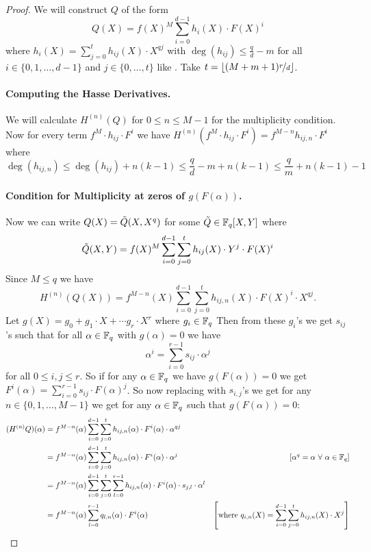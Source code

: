\begin{proof}
  We will construct $Q$ of the form $$Q(X)=f(X)^M\sum_{i=0}^{d-1}h_i(X)\cdot F(X)^i$$ where $h_i(X)=\sum_{j=0}^th_{ij}(X)\cdot X^{qj}$ with $\deg(h_{ij})\leq \frac{q}{d}-m$ for all $i\in\{0,1,\dots, d-1\}$ and $j\in\{0,\dots, t\}$ like \StepanovLinIndeplem. Take $t=\left\lfloor (M+m+1)\nicefrac{r}{d}\right\rfloor$. 
  \paragraph*{Computing the Hasse Derivatives.} %
  We will calculate $H^{(n)}(Q)$ for $0\leq n\leq M-1$ for the multiplicity condition. Now for every term $f^M\cdot h_{ij}\cdot F^i$ we have $H^{(n)}(f^M\cdot h_{ij}\cdot F^i)=f^{M-n}h_{ij,n}\cdot F^i$ where 
  \begin{equation}\label{eq:hijn}
    \deg(h_{ij,n})\leq \deg(h_{ij})+n(k-1)\leq \frac{q}d-m+n(k-1)\leq \frac{q}{m}+n(k-1)-1
  \end{equation}
  \paragraph*{Condition for Multiplicity at zeros of $g(F(\alpha))$.} Now we can write $Q(X)=\tilde{Q}(X,X^q)$ for some $\tilde{Q}\in\mathbb{F}_q[X,Y]$ where $$\tilde{Q}(X,Y)=f(X)^M\sum_{i=0}^{d-1}\sum_{j=0}^th_{ij}(X)\cdot Y^j\cdot F(X)^i$$Since $M\leq q$ we have $$H^{(n)}(Q(X))=f^{M-n}(X)\sum_{i=0}^{d-1}\sum_{j=0}^th_{ij,n}(X)\cdot F(X)^i\cdot X^{qj}.$$Let $g(X)=g_0+g_1\cdot X+\cdots g_r\cdot X^r$ where $g_i\in\mathbb{F}_q$ Then from these $g_i$'s we get $s_{ij}$'s such that for all $\alpha\in\mathbb{F}_q$ with $g(\alpha)=0$ we have $$\alpha^i=\sum_{i=0}^{r-1}s_{ij}\cdot \alpha^j$$ for all $0\leq i,j\leq r$. So if for any $\alpha\in\mathbb{F}_q$ we have $g(F(\alpha))=0$ we get $F^i(\alpha)=\sum_{i=0}^{r-1}s_{ij}\cdot F(\alpha)^j$. So now replacing with $s_{i,j}$'s we get for any $n\in\{0,1,\dots, M-1\}$ we get for any $\alpha\in\mathbb{F}_q$ such that $g(F(\alpha))=0$:
  \begin{align*}
    (H^{(n)}Q)(\alpha) & = f^{M-n}(\alpha)\sum_{i=0}^{d-1}\sum_{j=0}^th_{ij,n}(\alpha)\cdot F^i(\alpha)\cdot \alpha^{qj}\\ 
    & = f^{M-n}(\alpha)\sum_{i=0}^{d-1}\sum_{j=0}^th_{ij,n}(\alpha)\cdot F^i(\alpha)\cdot \alpha^{j} & [\alpha^q=\alpha\ \forall \ \alpha\in\bbF_q]\\ 
    & = f^{M-n}(\alpha)\sum_{i=0}^{d-1}\sum_{j=0}^t\sum_{l=0}^{r-1}h_{ij,n}(\alpha)\cdot F^i(\alpha)\cdot s_{j,l}\cdot \alpha^l \\ 
    & = f^{M-n}(\alpha)\sum_{l=0}^{r-1}q_{l,n}(\alpha)\cdot F^i(\alpha) & \lt[\text{where }q_{i,n}(X)=\sum_{i=0}^{d-1}\sum_{j=0}^th_{ij,n}(X)\cdot X^{j}\rt]
  \end{align*}

\end{proof}

